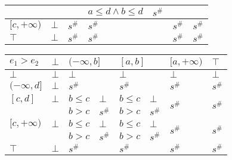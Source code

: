 \documentclass{article}
\begin{document}
\begin{table}[]
{\begin{tabular}{|l|l|ll|ll|ll|l|}
                                    &                         &                            &                                & $a \le d \land b \le d$ & $s^\#$                   &                            &                                           &                                                 \\ \hline
    $[c, +\infty)$                  & $\bot$                  & \multicolumn{2}{l|}{$s^\#$}                                 & \multicolumn{2}{l|}{$s^\#$}                        & \multicolumn{2}{l|}{$s^\#$}                                            & $s^\#$                                          \\ \hline
    $\top$                          & $\bot$                  & \multicolumn{2}{l|}{$s^\#$}                                 & \multicolumn{2}{l|}{$s^\#$}                        & \multicolumn{2}{l|}{$s^\#$}                                            & $s^\#$                                          \\ \hline
    \end{tabular}}
    \end{table}

\begin{table}[]
    \begin{tabular}{|l|l|ll|ll|l|l|}
    \hline
    $e_1 > e_2$    & $\bot$ & \multicolumn{2}{l|}{$(-\infty, b]$} & \multicolumn{2}{l|}{$[a, b]$} & $[a, +\infty)$          & $\top$                  \\ \hline
    $\bot$         & $\bot$ & \multicolumn{2}{l|}{$\bot$}         & \multicolumn{2}{l|}{$\bot$}   & $\bot$                  & $\bot$                  \\ \hline
    $(-\infty, d]$ & $\bot$ & \multicolumn{2}{l|}{$s^\#$}         & \multicolumn{2}{l|}{$s^\#$}   & $s^\#$                  & $s^\#$                  \\ \hline
    $[c, d]$       & $\bot$ & $b \le c$          & $\bot$         & $b \le c$       & $\bot$      & \multirow{2}{*}{$s^\#$} & \multirow{2}{*}{$s^\#$} \\
                   &        & $b > c$            & $s^\#$         & $b > c$         & $s^\#$      &                         &                         \\ \hline
    $[c, +\infty)$ & $\bot$ & $b \le c$          & $\bot$         & $b \le c$       & $\bot$      & \multirow{2}{*}{$s^\#$} & \multirow{2}{*}{$s^\#$} \\
                   &        & $b > c$            & $s^\#$         & $b > c$         & $s^\#$      &                         &                         \\ \hline
    $\top$         & $\bot$ & \multicolumn{2}{l|}{$s^\#$}         & \multicolumn{2}{l|}{$s^\#$}   & $s^\#$                  & $s^\#$                  \\ \hline
    \end{tabular}
    \end{table}
\end{document}
